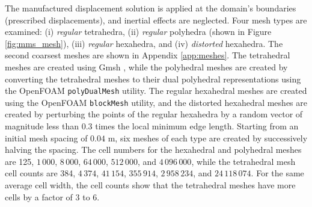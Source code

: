 \documentclass[sn-mathphys,Numbered]{sn-jnl}%
\begin{document}
The manufactured displacement solution is applied at the domain's boundaries (prescribed displacements), and inertial effects are neglected.
Four mesh types are examined:
(i) \emph{regular} tetrahedra, (ii) \emph{regular} polyhedra (shown in Figure \ref{fig:mms_mesh}), (iii) \emph{regular} hexahedra, and (iv) \emph{distorted} hexahedra.
The second coarsest meshes are shown in Appendix \ref{app:meshes}.
The tetrahedral meshes are created using Gmsh \citep{geuzaine2009gmsh}, while the polyhedral meshes are created by converting the tetrahedral meshes to their dual polyhedral representations using the OpenFOAM \texttt{polyDualMesh} utility.
The regular hexahedral meshes are created using the OpenFOAM \texttt{blockMesh} utility, and the distorted hexahedral meshes are created by perturbing the points of the regular hexahedra by a random vector of magnitude less than 0.3 times the local minimum edge length.
Starting from an initial mesh spacing of $0.04$ m, six meshes of each type are created by successively halving the spacing.
The cell numbers for the hexahedral and polyhedral meshes are 125, $1\,000$, $8\,000$, $64\,000$, $512\,000$, and $4\,096\,000$, while the tetrahedral mesh cell counts are 384, $4\,374$, $41\,154$, $355\,914$, $2\,958\,234$, and $24\,118\,074$.
For the same average cell width, the cell counts show that the tetrahedral meshes have more cells by a factor of 3 to 6.
\end{document}
